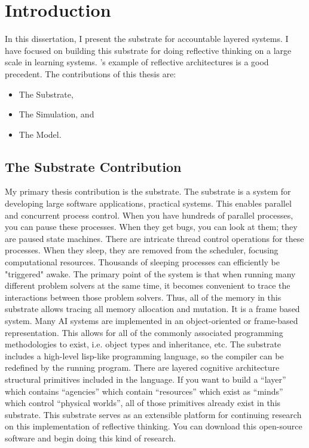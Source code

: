 \chapter{Introduction}
\label{chapter:introduction}

In this dissertation, I present the substrate for accountable layered systems.
I have focused on building this substrate for doing reflective thinking on a large scale in learning systems.  \cite{singh:2005}'s example of reflective architectures is a good precedent.
The contributions of this thesis are:

\begin{itemize}
\item The Substrate,
\item The Simulation, and
\item The Model.
\end{itemize}
  
\section{The Substrate Contribution}

My primary thesis contribution is the substrate.  The substrate is a
system for developing large software applications, practical systems.
This enables parallel and concurrent process control.  When you have
hundreds of parallel processes, you can pause these processes.  When
they get bugs, you can look at them; they are paused state machines.
There are intricate thread control operations for these processes.
When they sleep, they are removed from the scheduler, focusing
computational resources.  Thousands of sleeping processes can
efficiently be "triggered" awake.  The primary point of the system is
that when running many different problem solvers at the same time, it
becomes convenient to trace the interactions between those problem
solvers.  Thus, all of the memory in this substrate allows tracing all
memory allocation and mutation.  It is a frame based system.  Many AI
systems are implemented in an object-oriented or frame-based
representation.  This allows for all of the commonly associated
programming methodologies to exist, i.e.  object types and
inheritance, etc.  The substrate includes a high-level lisp-like
programming language, so the compiler can be redefined by the running
program.  There are layered cognitive architecture structural
primitives included in the language.  If you want to build a ``layer''
which contains ``agencies'' which contain ``resources'' which exist as
``minds'' which control ``physical worlds'', all of those primitives
already exist in this substrate.  This substrate serves as an
extensible platform for continuing research on this implementation of
reflective thinking.  You can download this open-source software and
begin doing this kind of research.

